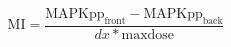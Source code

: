 \begin{equation}
  \text{MI} = \frac{  \text{MAPKpp}_{\text{front}}
                    - \text{MAPKpp}_{\text{back}} }
                    { dx * \text{maxdose} }
\end{equation}


